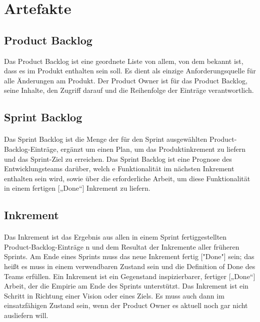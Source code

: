 \documentclass{article}
\begin{document}
\section{Artefakte}
\subsection{Product Backlog}
Das Product Backlog ist eine geordnete Liste von allem, von dem bekannt ist, dass es im Produkt enthalten sein soll. Es dient als einzige Anforderungsquelle für alle Änderungen am Produkt. Der Product Owner ist für das Product Backlog, seine Inhalte, den Zugriff darauf und die Reihenfolge der Einträge verantwortlich.
\cite[S.~15]{scrum}

\subsection{Sprint Backlog}
\paragraph{}
Das Sprint Backlog ist die Menge der für den Sprint ausgewählten
Product-Backlog-Einträge, ergänzt um einen Plan, um das Produktinkrement zu liefern und das Sprint-Ziel zu erreichen. Das Sprint Backlog ist eine Prognose des Entwicklungsteams darüber, welch e Funktionalität im nächsten Inkrement enthalten sein wird, sowie über die erforderliche Arbeit, um diese Funktionalität in einem fertigen [„Done“] Inkrement zu liefern.
\cite[S.~16]{scrum}

\subsection{Inkrement}
\paragraph{}
Das Inkrement ist das Ergebnis aus allen in einem Sprint fertiggestellten Product-Backlog-Einträge n und dem Resultat der Inkremente aller früheren Sprints. Am Ende eines Sprints muss das neue Inkrement fertig ["Done"] sein; das heißt es muss in einem verwendbaren Zustand sein und die Definition of Done des Teams erfüllen. Ein Inkrement ist ein Gegenstand inspizierbarer, fertiger [„Done“] Arbeit, der die Empirie am Ende des Sprints unterstützt. Das Inkrement ist ein Schritt in Richtung einer Vision oder eines Ziels. Es muss auch dann im einsatzfähigen Zustand sein, wenn der Product Owner es aktuell noch gar nicht ausliefern will.
\cite[S.~17]{scrum}
\end{document}

